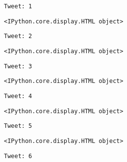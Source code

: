 \documentclass[11pt]{article}
\begin{document}
    \begin{Verbatim}[commandchars=\\\{\}]
Tweet: 1
    \end{Verbatim}

    
    \begin{Verbatim}[commandchars=\\\{\}]
<IPython.core.display.HTML object>
    \end{Verbatim}

    
    \begin{Verbatim}[commandchars=\\\{\}]
Tweet: 2
    \end{Verbatim}

    
    \begin{Verbatim}[commandchars=\\\{\}]
<IPython.core.display.HTML object>
    \end{Verbatim}

    
    \begin{Verbatim}[commandchars=\\\{\}]
Tweet: 3
    \end{Verbatim}

    
    \begin{Verbatim}[commandchars=\\\{\}]
<IPython.core.display.HTML object>
    \end{Verbatim}

    
    \begin{Verbatim}[commandchars=\\\{\}]
Tweet: 4
    \end{Verbatim}

    
    \begin{Verbatim}[commandchars=\\\{\}]
<IPython.core.display.HTML object>
    \end{Verbatim}

    
    \begin{Verbatim}[commandchars=\\\{\}]
Tweet: 5
    \end{Verbatim}

    
    \begin{Verbatim}[commandchars=\\\{\}]
<IPython.core.display.HTML object>
    \end{Verbatim}

    
    \begin{Verbatim}[commandchars=\\\{\}]
Tweet: 6
    \end{Verbatim}
\end{document}
